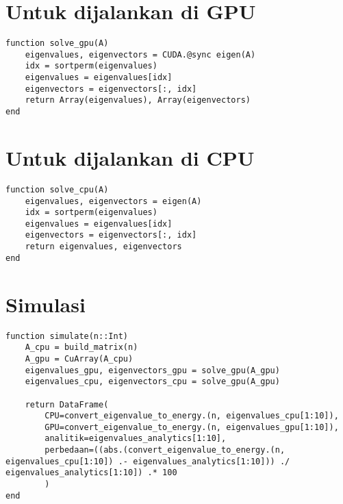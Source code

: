 \section{Untuk dijalankan di GPU}

\begin{lstlisting}
function solve_gpu(A)
    eigenvalues, eigenvectors = CUDA.@sync eigen(A)
    idx = sortperm(eigenvalues)
    eigenvalues = eigenvalues[idx]
    eigenvectors = eigenvectors[:, idx]
    return Array(eigenvalues), Array(eigenvectors)
end
\end{lstlisting}

\section{Untuk dijalankan di CPU}

\begin{lstlisting}
function solve_cpu(A)
    eigenvalues, eigenvectors = eigen(A)
    idx = sortperm(eigenvalues)
    eigenvalues = eigenvalues[idx]
    eigenvectors = eigenvectors[:, idx]
    return eigenvalues, eigenvectors
end
\end{lstlisting}

\section{Simulasi}

\begin{lstlisting}
function simulate(n::Int)
    A_cpu = build_matrix(n)
    A_gpu = CuArray(A_cpu)
    eigenvalues_gpu, eigenvectors_gpu = solve_gpu(A_gpu)
    eigenvalues_cpu, eigenvectors_cpu = solve_gpu(A_gpu)

    return DataFrame(
        CPU=convert_eigenvalue_to_energy.(n, eigenvalues_cpu[1:10]), 
        GPU=convert_eigenvalue_to_energy.(n, eigenvalues_gpu[1:10]), 
        analitik=eigenvalues_analytics[1:10], 
        perbedaan=((abs.(convert_eigenvalue_to_energy.(n, eigenvalues_cpu[1:10]) .- eigenvalues_analytics[1:10])) ./ eigenvalues_analytics[1:10]) .* 100
        )
end
\end{lstlisting}
